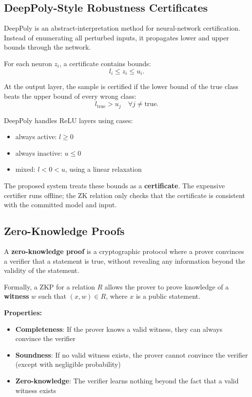 \documentclass[11pt,a4paper]{article}
\begin{document}
\subsection{DeepPoly-Style Robustness Certificates}

DeepPoly is an abstract-interpretation method for neural-network certification. Instead of enumerating all perturbed inputs, it propagates lower and upper bounds through the network.

For each neuron $z_i$, a certificate contains bounds:
\[
    l_i \leq z_i \leq u_i.
\]

At the output layer, the sample is certified if the lower bound of the true class beats the upper bound of every wrong class:
\[
    l_{\text{true}} > u_j \quad \forall j \neq \text{true}.
\]

DeepPoly handles ReLU layers using cases:
\begin{itemize}
    \item always active: $l \geq 0$
    \item always inactive: $u \leq 0$
    \item mixed: $l < 0 < u$, using a linear relaxation
\end{itemize}

The proposed system treats these bounds as a \textbf{certificate}. The expensive certifier runs offline; the ZK relation only checks that the certificate is consistent with the committed model and input.

\subsection{Zero-Knowledge Proofs}

A \textbf{zero-knowledge proof} is a cryptographic protocol where a prover convinces a verifier that a statement is true, without revealing any information beyond the validity of the statement.

Formally, a ZKP for a relation $R$ allows the prover to prove knowledge of a \textbf{witness} $w$ such that $(x, w) \in R$, where $x$ is a public statement.

\textbf{Properties:}
\begin{itemize}
    \item \textbf{Completeness}: If the prover knows a valid witness, they can always convince the verifier
    \item \textbf{Soundness}: If no valid witness exists, the prover cannot convince the verifier (except with negligible probability)
    \item \textbf{Zero-knowledge}: The verifier learns nothing beyond the fact that a valid witness exists
\end{itemize}
\end{document}

